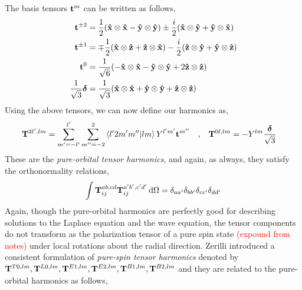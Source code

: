 \documentclass[a4paper,11pt]{article}
\begin{document}
The basis tensors $ \vb{t}^m $ can be written as follows,
\begin{align*}
\vb{t}^{\pm 2} &= \dfrac{1}{2} (\vu{x} \otimes \vu{x}  - \vu{y} \otimes \vu{y} ) \pm \dfrac{i}{2} (\vu{x} \otimes \vu{y} + \vu{y} \otimes \vu{x} ) \\
\vb{t}^{\pm 1} &= \mp \dfrac{1}{2} (\vu{x} \otimes \vu{z}  + \vu{z} \otimes \vu{x} ) -\dfrac{i}{2} (\vu{z} \otimes \vu{y} + \vu{y} \otimes \vu{z} ) \\
\vb{t}^0 &= \dfrac{1}{\sqrt{6}} (- \vu{x} \otimes \vu{x}  - \vu{y} \otimes \vu{y} + 2 \vu{z} \otimes \vu{z} )\\
\dfrac{1}{\sqrt{3}}\bm{\delta}  &=\dfrac{1}{\sqrt{3}}  (\vu{x} \otimes \vu{x}  + \vu{y} \otimes \vu{y} + \vu{z} \otimes \vu{z})
\end{align*}
Using the above tensors, we can now define our harmonics as,
\begin{align*}
\vb{T}^{2l',lm} &= \sum_{m'=-l'}^{l'} \sum_{m''=-2}^2 \ip{l'2m'm''}{ lm} Y^{l'm'} \vb{t}^{m''} \qq{,} \vb{T}^{0l,lm} = - Y^{lm} \dfrac{\bm{\delta}}{\sqrt{3}}
\end{align*}
These are the \textit{pure-orbital tensor harmonics}, and again, as always, they satisfy the orthonormality relations,
\begin{equation*}
\int \vb{T}^{ab,cd}_{ij} \vb{T}^{a'b',c'd'}_{ij}  \dd{\Omega} = \delta_{a a'} \delta_{b b'} \delta_{c c'} \delta_{d d'}
\end{equation*}
Again, though the pure-orbital harmonics are perfectly good for describing solutions to the Laplace equation and the wave equation, the tensor components do not transform as the polarization tensor of a pure spin state \textcolor{red}{(expound from notes)} under local rotations about the radial direction. Zerilli introduced a consistent formulation of \textit{pure-spin tensor harmonics} denoted by $ \vb{T}^{T0,lm}, \vb{T}^{L0,lm}, \vb{T}^{E1,lm}, \vb{T}^{E2,lm} , \vb{T}^{B1,lm} , \vb{T}^{B2,lm}  $  and they are related to the pure-orbital harmonics as follows,
\end{document}
